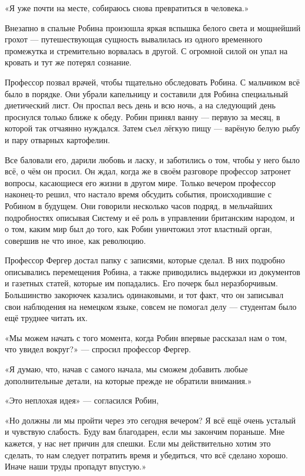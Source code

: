 \documentclass[a5paper, 9pt,
final, openany, twoside=true]{memoir}
\begin{document}
«Я уже почти на месте, собираюсь снова превратиться в человека.»

Внезапно в спальне Робина произошла яркая вспышка белого света и мощнейший грохот — путешествующая сущность вывалилась из одного временного промежутка и стремительно ворвалась в другой. С огромной силой он упал на кровать и тут же потерял сознание.\bigskip

Профессор позвал врачей, чтобы тщательно обследовать Робина. С мальчиком всё было в порядке. Они убрали капельницу и составили для Робина специальный диетический лист. Он проспал весь день и всю ночь, а на следующий день проснулся только ближе к обеду. Робин принял ванну — первую за месяц, в которой так отчаянно нуждался. Затем съел лёгкую пищу — варёную белую рыбу и пару отварных картофелин.

Все баловали его, дарили любовь и ласку, и заботились о том, чтобы у него было всё, о чём он просил. Он ждал, когда же в своём разговоре профессор затронет вопросы, касающиеся его жизни в другом мире. Только вечером профессор наконец-то решил, что настало время обсудить события, происходившие с Робином в будущем. Они говорили несколько часов подряд, в мельчайших подробностях описывая Систему и её роль в управлении британским народом, и о том, каким мир был до того, как Робин уничтожил этот властный орган, совершив не что иное, как революцию.

Профессор Фергер достал папку с записями, которые сделал. В них подробно описывались перемещения Робина, а также приводились выдержки из документов и газетных статей, которые им попадались. Его почерк был неразборчивым. Большинство закорючек казались одинаковыми, и тот факт, что он записывал свои наблюдения на немецком языке, совсем не помогал делу — студентам было ещё труднее читать их.

«Мы можем начать с того момента, когда Робин впервые рассказал нам о том, что увидел вокруг?» — спросил профессор Фергер.

«Я думаю, что, начав с самого начала, мы сможем добавить любые дополнительные детали, на которые прежде не обратили внимания.»

«Это неплохая идея» — согласился Робин,

«Но должны ли мы пройти через это сегодня вечером? Я всё ещё очень усталый и чувствую слабость. Буду вам благодарен, если мы закончим пораньше. Мне кажется, у нас нет причин для спешки. Если мы действительно хотим это сделать, то нам следует потратить время и убедиться, что всё сделано хорошо. Иначе наши труды пропадут впустую.»
\end{document}
